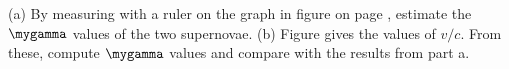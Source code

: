 (a) By measuring with a ruler on the graph in figure  on page \pageref{fig:supernovae},
estimate the $\mygamma$ values of the two supernovae.\answercheck\hwendpart
(b) Figure  gives the values of $v/c$. From these, compute $\mygamma$ values and
compare with the results from part a.\answercheck\hwendpart
